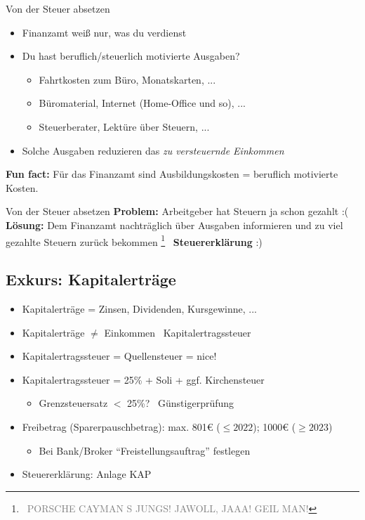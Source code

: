 \documentclass{beamer}
\let\oldfootnote\footnote
\renewcommand{\footnote}[1]
{%
	\oldfootnote
	{
		\tiny
		\textcolor{gray}{\ #1}
	}%
}
\begin{document}
			\begin{frame}{Von der Steuer absetzen}
				\begin{itemize}
					\item Finanzamt weiß nur, was du verdienst
					\item Du hast beruflich/steuerlich motivierte Ausgaben?
					\begin{itemize}
						\item Fahrtkosten zum Büro, Monatskarten, ...
						\item Büromaterial, Internet (Home-Office und so), ...
						\item Steuerberater, Lektüre über Steuern, ...
					\end{itemize}
					\item Solche Ausgaben reduzieren das \textit{zu versteuernde Einkommen}
				\end{itemize}\n\pause
				
				\textbf{Fun fact:} Für das Finanzamt sind Ausbildungskosten = beruflich motivierte Kosten.
			\end{frame}
				
			\begin{frame}{Von der Steuer absetzen}
				\textbf{Problem:} Arbeitgeber hat Steuern ja schon gezahlt :(\n
				\textbf{Lösung:} Dem Finanzamt nachträglich über Ausgaben informieren und zu viel gezahlte Steuern zurück bekommen\footnote{PORSCHE CAYMAN S JUNGS! JAWOLL, JAAA! GEIL MAN!}\n
				\textrightarrow\ \textbf{Steuererklärung} :)
			\end{frame}
		
		\subsection{Exkurs: Kapitalerträge}
		
			\begin{frame}
				\begin{itemize}
					\item Kapitalerträge = Zinsen, Dividenden, Kursgewinne, ...
					\item Kapitalerträge $\neq$ Einkommen \textrightarrow\ Kapitalertragssteuer\pause
					\item Kapitalertragssteuer = Quellensteuer = nice!
					\item Kapitalertragssteuer = 25\% + Soli + ggf. Kirchensteuer
					\begin{itemize}
						\item Grenzsteuersatz $<$ 25\%? \textrightarrow\ Günstigerprüfung
					\end{itemize}\pause
					\item Freibetrag (Sparerpauschbetrag): max. 801€ ($\leq2022$); 1000€ ($\geq2023$)
					\begin{itemize}
						\item Bei Bank/Broker "`Freistellungsauftrag"' festlegen
					\end{itemize}
					\item Steuererklärung: Anlage KAP
				\end{itemize}
			\end{frame}
		
\end{document}
